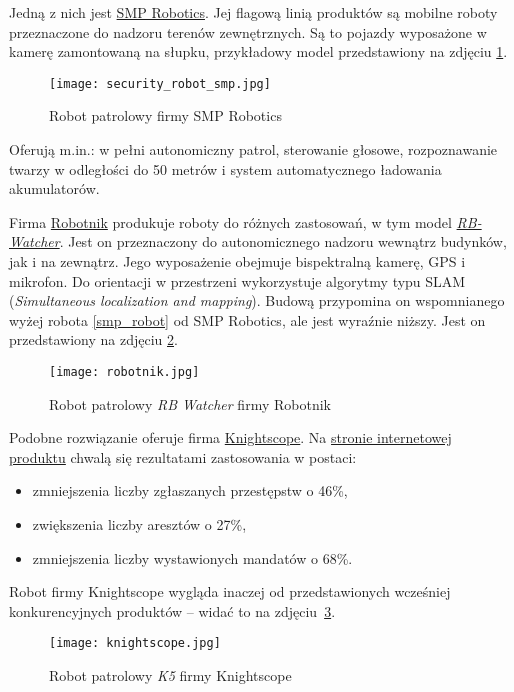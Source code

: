 \label{smp_robot}
Jedną z nich jest \href{https://smprobotics.com/}{SMP Robotics}.
Jej flagową linią produktów są mobilne roboty przeznaczone do nadzoru terenów zewnętrznych.
Są to pojazdy wyposażone w kamerę zamontowaną na słupku, przykładowy model przedstawiony na zdjęciu \ref{rys:smp_robot}.
\begin{figure}[!hb]
    \centering \texttt{[image: security\_robot\_smp.jpg]}
    \caption{Robot patrolowy firmy SMP Robotics}
    \label{rys:smp_robot}
\end{figure}
Oferują m.in.: w pełni autonomiczny patrol, sterowanie głosowe, rozpoznawanie twarzy w odległości do 50 metrów i system automatycznego ładowania akumulatorów.

Firma \href{https://robotnik.eu/}{Robotnik} produkuje roboty do różnych zastosowań, w tym model \href{https://robotnik.eu/products/mobile-robots/rb-watcher/}{\textit{RB-Watcher}}.
Jest on przeznaczony do autonomicznego nadzoru wewnątrz budynków, jak i na zewnątrz.
Jego wyposażenie obejmuje bispektralną kamerę, GPS i mikrofon.
Do orientacji w przestrzeni wykorzystuje algorytmy typu SLAM (\textit{Simultaneous localization and mapping}).
Budową przypomina on wspomnianego wyżej robota \ref{smp_robot} od SMP Robotics, ale jest wyraźnie niższy.
Jest on przedstawiony na zdjęciu \ref{rys:robotnik}.
\begin{figure}[!hb]
    \centering \texttt{[image: robotnik.jpg]}
    \caption{Robot patrolowy \textit{RB Watcher} firmy Robotnik}
    \label{rys:robotnik}
\end{figure}

Podobne rozwiązanie oferuje firma \href{https://www.knightscope.com/}{Knightscope}.
Na \href{https://www.knightscope.com/products/k5}{stronie internetowej produktu} chwalą się rezultatami zastosowania w postaci:
\begin{itemize}
    \item zmniejszenia liczby zgłaszanych przestępstw o 46\%,
    \item zwiększenia liczby aresztów o 27\%,
    \item zmniejszenia liczby wystawionych mandatów o 68\%.
\end{itemize}
Robot firmy Knightscope wygląda inaczej od przedstawionych wcześniej konkurencyjnych produktów -- widać to na zdjęciu~\ref{rys:knightscope}.
\begin{figure}[!hb]
    \centering \texttt{[image: knightscope.jpg]}
    \caption{Robot patrolowy \textit{K5} firmy Knightscope}
    \label{rys:knightscope}
\end{figure}

